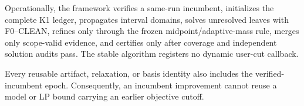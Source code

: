 Operationally, the framework verifies a same-run incumbent, initializes the
complete K1 ledger, propagates interval domains, solves unresolved leaves with
F0--CLEAN, refines only through the frozen midpoint/adaptive-mass rule, merges
only scope-valid evidence, and certifies only after coverage and independent
solution audits pass. The stable algorithm registers no dynamic user-cut
callback.

Every reusable artifact, relaxation, or basis identity also includes the
verified-incumbent epoch. Consequently, an incumbent improvement cannot reuse
a model or LP bound carrying an earlier objective cutoff.
